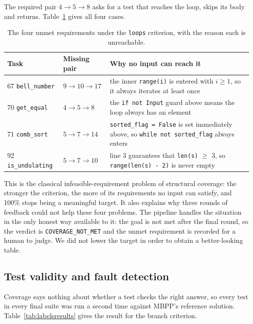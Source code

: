 \documentclass[11pt,a4paper]{article}
\begin{document}
The required pair $4 \rightarrow 5 \rightarrow 8$ asks for a test that reaches the loop, skips its body and
returns. Table~\ref{tab:infeasible} gives all four cases.

\begin{table}[htbp]
\centering
\small
\caption{The four unmet requirements under the \texttt{loops} criterion, with the reason each is unreachable.}
\label{tab:infeasible}
\begin{tabular}{@{}llp{8.6cm}@{}}
\toprule
\textbf{Task} & \textbf{Missing pair} & \textbf{Why no input can reach it} \\
\midrule
67 \texttt{bell\_number} & $9 \rightarrow 10 \rightarrow 17$ & the inner \texttt{range(i)} is entered with
$i \geq 1$, so it always iterates at least once \\
70 \texttt{get\_equal} & $4 \rightarrow 5 \rightarrow 8$ & the \texttt{if not Input} guard above means the loop
always has an element \\
71 \texttt{comb\_sort} & $5 \rightarrow 7 \rightarrow 14$ & \texttt{sorted\_flag = False} is set immediately
above, so \texttt{while not sorted\_flag} always enters \\
92 \texttt{is\_undulating} & $5 \rightarrow 7 \rightarrow 10$ & line 3 guarantees that
\texttt{len(s)} $\geq$ 3, so \texttt{range(len(s) - 2)} is never empty \\
\bottomrule
\end{tabular}
\end{table}

This is the classical infeasible-requirement problem of structural coverage: the stronger the criterion, the
more of its requirements no input can satisfy, and 100\% stops being a meaningful target. It also explains why
three rounds of feedback could not help these four problems. The pipeline handles the situation in the only
honest way available to it: the goal is not met after the final round, so the verdict is
\texttt{COVERAGE\_NOT\_MET} and the unmet requirement is recorded for a human to judge. We did not lower the
target in order to obtain a better-looking table.

\subsection{Test validity and fault detection}
\label{sec:validity}

Coverage says nothing about whether a test checks the right answer, so every test in every final suite was run
a second time against MBPP's reference solution. Table~\ref{tab:labelsresults} gives the result for the branch
criterion.
\end{document}

